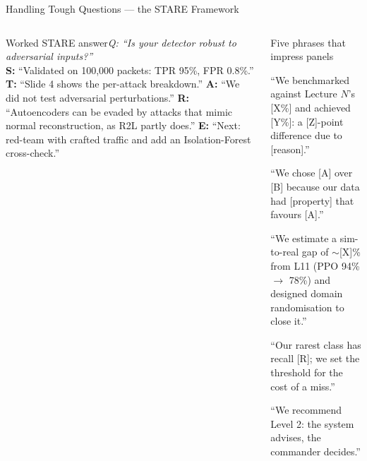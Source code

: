\documentclass[aspectratio=169,10pt,t]{beamer}
\begin{document}
\begin{frame}{Handling Tough Questions --- the STARE Framework}
\begin{columns}[T]
\begin{cbox}[ISSAgrn]{Worked STARE answer}\scriptsize\textit{Q: ``Is your detector robust to adversarial inputs?''}\\ \textbf{S:} ``Validated on 100,000 packets: TPR 95\%, FPR 0.8\%.'' \textbf{T:} ``Slide 4 shows the per-attack breakdown.'' \textbf{A:} ``We did not test adversarial perturbations.'' \textbf{R:} ``Autoencoders can be evaded by attacks that mimic normal reconstruction, as R2L partly does.'' \textbf{E:} ``Next: red-team with crafted traffic and add an Isolation-Forest cross-check.''\end{cbox}
\begin{cbox}[AccentCol]{Five phrases that impress panels}\scriptsize\begin{te}\item ``We benchmarked against Lecture $N$'s [X\%] and achieved [Y\%]: a [Z]-point difference due to [reason].''\item ``We chose [A] over [B] because our data had [property] that favours [A].''\item ``We estimate a sim-to-real gap of $\sim$[X]\% from L11 (PPO 94\% $\to$ 78\%) and designed domain randomisation to close it.''\item ``Our rarest class has recall [R]; we set the threshold for the cost of a miss.''\item ``We recommend Level 2: the system advises, the commander decides.''\end{te}\end{cbox}
\end{columns}
\end{frame}
\end{document}
